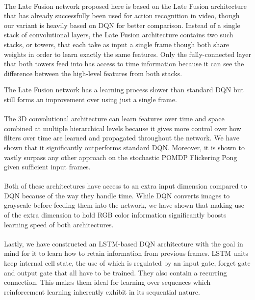 \paragraph{}
The Late Fusion network proposed here
is based on the Late Fusion architecture
that has already successfully been used
for action recognition in video,
though our variant is heavily based on DQN
for better comparison.
Instead of a single stack of convolutional layers,
the Late Fusion architecture contains
two such stacks, or towers, that each take as input a single frame
though both share weights in order to learn exactly the same features.
Only the fully-connected layer
that both towers feed into
has access to time information
because it can see
the difference between the high-level features
from both stacks.

The Late Fusion network
has a learning process slower than standard DQN
but still forms an improvement over using
just a single frame.

\paragraph{}
The 3D convolutional architecture can
learn features over time and space combined
at multiple hierarchical levels
because it gives more control over how
filters over time are learned and propagated throughout the network.
We have shown that it significantly outperforms standard DQN.
Moreover,
it is shown to vastly surpass any other approach
on the stochastic POMDP
Flickering Pong
given sufficient input frames.

\paragraph{}
Both of these architectures have access to an extra input dimension
compared to DQN because of the way they handle time.
While DQN converts images to grayscale before feeding them
into the network,
we have shown that making use of the extra dimension
to hold RGB color information
significantly boosts learning speed
of both architectures.

\paragraph{}
Lastly,
we have constructed an LSTM-based DQN architecture
with the goal in mind for it to learn how to retain
information from previous frames.
LSTM units keep internal cell state,
the use of which is regulated by
an input gate, forget gate and output gate
that all have to be trained.
They also contain a recurring connection.
This makes them ideal for learning over sequences
which reinforcement learning inherently exhibit
in its sequential nature.

